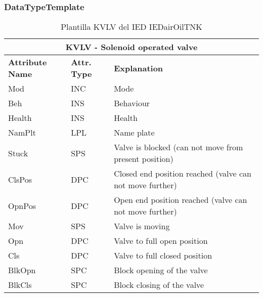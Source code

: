     \subsubsection{DataTypeTemplate}
    \begin{table}[H]
    \begin{center}
    \begin{tabular}{|l|l|p{8.5cm}|}
            \hline
            \multicolumn{3}{|c|}{\cellcolor[gray]{0.8} \textbf{ KVLV}  - Solenoid operated valve} \\
            \hline
            \textbf{Attribute Name} & \textbf{Attr. Type} & \textbf{Explanation} \\
            \hline 
            Mod & INC & Mode \\
            \hline
            Beh & INS & Behaviour \\
            \hline
            Health & INS & Health \\
            \hline
            NamPlt & LPL & Name plate \\
            \hline
            Stuck & SPS & Valve is blocked (can not move from present position) \\
            \hline
            ClsPos & DPC & Closed end position reached (valve can not move further) \\
            \hline
            OpnPos & DPC & Open end position reached (valve can not move further) \\
            \hline
            Mov & SPS & Valve is moving \\
            \hline
            Opn & DPC & Valve to full open position \\
            \hline
            Cls & DPC & Valve to full closed position \\
            \hline
            BlkOpn & SPC & Block opening of the valve \\
            \hline
            BlkCls & SPC & Block closing of the valve \\
            \hline
    \end{tabular}
    \caption{Plantilla KVLV del IED IEDairOilTNK}
    \label{table:lnTypeKVLV_solenoid_operated}
    \end{center}
    \end{table}
    
    
    